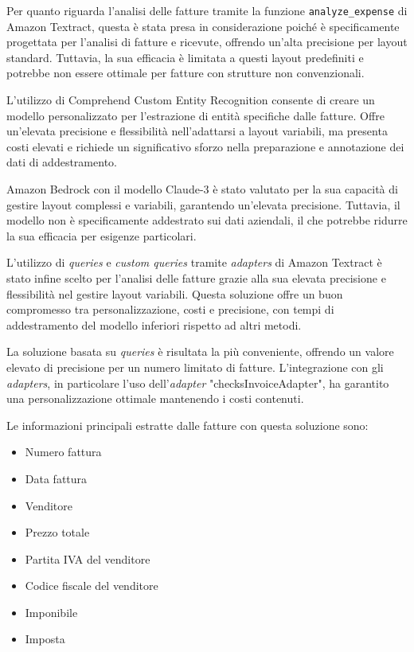 Per quanto riguarda l'analisi delle fatture tramite la funzione \texttt{analyze\_expense} di Amazon Textract, questa è stata presa in considerazione poiché è specificamente progettata per l'analisi di fatture e ricevute, offrendo un'alta precisione per layout standard. Tuttavia, la sua efficacia è limitata a questi layout predefiniti e potrebbe non essere ottimale per fatture con strutture non convenzionali.

L'utilizzo di Comprehend Custom Entity Recognition consente di creare un modello personalizzato per l'estrazione di entità specifiche dalle fatture. Offre un'elevata precisione e flessibilità nell'adattarsi a layout variabili, ma presenta costi elevati e richiede un significativo sforzo nella preparazione e annotazione dei dati di addestramento.

Amazon Bedrock con il modello Claude-3 è stato valutato per la sua capacità di gestire layout complessi e variabili, garantendo un'elevata precisione. Tuttavia, il modello non è specificamente addestrato sui dati aziendali, il che potrebbe ridurre la sua efficacia per esigenze particolari.

L'utilizzo di \textit{queries} e \textit{custom queries} tramite \textit{adapters} di Amazon Textract è stato infine scelto per l'analisi delle fatture grazie alla sua elevata precisione e flessibilità nel gestire layout variabili. Questa soluzione offre un buon compromesso tra personalizzazione, costi e precisione, con tempi di addestramento del modello inferiori rispetto ad altri metodi.

La soluzione basata su \textit{queries} è risultata la più conveniente, offrendo un valore elevato di precisione per un numero limitato di fatture. L'integrazione con gli \textit{adapters}, in particolare l'uso dell'\textit{adapter} "checksInvoiceAdapter", ha garantito una personalizzazione ottimale mantenendo i costi contenuti.

Le informazioni principali estratte dalle fatture con questa soluzione sono:

\begin{itemize}
    \item Numero fattura
    \item Data fattura
    \item Venditore
    \item Prezzo totale
    \item Partita IVA del venditore
    \item Codice fiscale del venditore
    \item Imponibile
    \item Imposta
\end{itemize}


